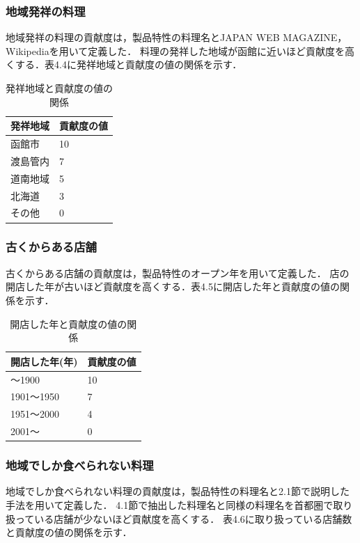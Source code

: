 \documentclass{funthesis}
\begin{document}
\subsubsection{地域発祥の料理}
地域発祥の料理の貢献度は，製品特性の料理名とJAPAN WEB MAGAZINE\cite{12}，Wikipedia\cite{13}を用いて定義した．
料理の発祥した地域が函館に近いほど貢献度を高くする．表4.4に発祥地域と貢献度の値の関係を示す．

\begin{table}[htb]
  \begin{center}
  \scriptsize
    \caption{発祥地域と貢献度の値の関係}
    \normalsize
   \begin{tabular}{p{6cm}|p{6cm}}
    \hline
発祥地域 & 貢献度の値 \\ \hline\hline
      函館市 & 10  \\ \hline
      渡島管内 & 7 \\ \hline
      道南地域 & 5 \\ \hline
      北海道 & 3 \\ \hline
      その他 & 0 \\ \hline
  \end{tabular}
  \end{center}
\end{table}

\subsubsection{古くからある店舗}
古くからある店舗の貢献度は，製品特性のオープン年を用いて定義した．
店の開店した年が古いほど貢献度を高くする．表4.5に開店した年と貢献度の値の関係を示す．

\begin{table}[htb]
  \begin{center}
  \scriptsize
    \caption{開店した年と貢献度の値の関係}
    \normalsize
   \begin{tabular}{p{6cm}|p{6cm}}
    \hline
開店した年(年) & 貢献度の値 \\ \hline\hline
      〜1900 & 10  \\ \hline
      1901〜1950 & 7 \\ \hline
      1951〜2000 & 4 \\ \hline
      2001〜 & 0 \\ \hline
  \end{tabular}
  \end{center}
\end{table}

\subsubsection{地域でしか食べられない料理}
地域でしか食べられない料理の貢献度は，製品特性の料理名と2.1節で説明した手法を用いて定義した．
4.1節で抽出した料理名と同様の料理名を首都圏で取り扱っている店舗が少ないほど貢献度を高くする．
表4.6に取り扱っている店舗数と貢献度の値の関係を示す．
\end{document}
